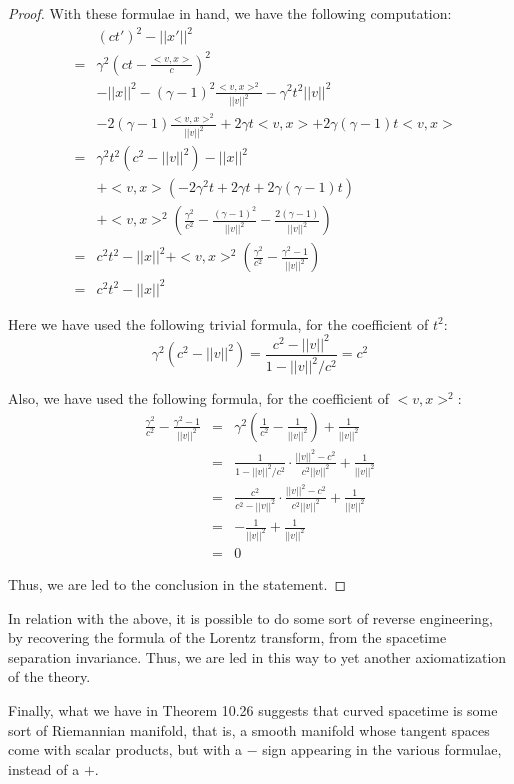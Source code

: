 \documentclass[12pt]{amsbook}
\begin{document}
\begin{proof}
With these formulae in hand, we have the following computation:
\begin{eqnarray*}
&&(ct')^2-||x'||^2\\
&=&\gamma^2\left(ct-\frac{<v,x>}{c}\right)^2\\
&&-||x||^2-(\gamma-1)^2\frac{<v,x>^2}{||v||^2}-\gamma^2t^2||v||^2\\
&&-2(\gamma-1)\frac{<v,x>^2}{||v||^2}+2\gamma t<v,x>+2\gamma(\gamma-1)t<v,x>\\
&=&\gamma^2t^2(c^2-||v||^2)-||x||^2\\
&&+<v,x>(-2\gamma^2 t+2\gamma t+2\gamma(\gamma-1)t)\\
&&+<v,x>^2\left(\frac{\gamma^2}{c^2}-\frac{(\gamma-1)^2}{||v||^2}-\frac{2(\gamma-1)}{||v||^2}\right)\\
&=&c^2t^2-||x||^2+<v,x>^2\left(\frac{\gamma^2}{c^2}-\frac{\gamma^2-1}{||v||^2}\right)\\
&=&c^2t^2-||x||^2
\end{eqnarray*}

Here we have used the following trivial formula, for the coefficient of $t^2$:
$$\gamma^2(c^2-||v||^2)
=\frac{c^2-||v||^2}{1-||v||^2/c^2}
=c^2$$

Also, we have used the following formula, for the coefficient of $<v,x>^2$:
\begin{eqnarray*}
\frac{\gamma^2}{c^2}-\frac{\gamma^2-1}{||v||^2}
&=&\gamma^2\left(\frac{1}{c^2}-\frac{1}{||v||^2}\right)+\frac{1}{||v||^2}\\
&=&\frac{1}{1-||v||^2/c^2}\cdot\frac{||v||^2-c^2}{c^2||v||^2}+\frac{1}{||v||^2}\\
&=&\frac{c^2}{c^2-||v||^2}\cdot\frac{||v||^2-c^2}{c^2||v||^2}+\frac{1}{||v||^2}\\
&=&-\frac{1}{||v||^2}+\frac{1}{||v||^2}\\
&=&0
\end{eqnarray*}

Thus, we are led to the conclusion in the statement.
\end{proof}

In relation with the above, it is possible to do some sort of reverse engineering, by recovering the formula of the Lorentz transform, from the spacetime separation invariance. Thus, we are led in this way to yet another axiomatization of the theory.

\bigskip

Finally, what we have in Theorem 10.26 suggests that curved spacetime is some sort of Riemannian manifold, that is, a smooth manifold whose tangent spaces come with scalar products, but with a $-$ sign appearing in the various formulae, instead of a $+$. 
\end{document}
